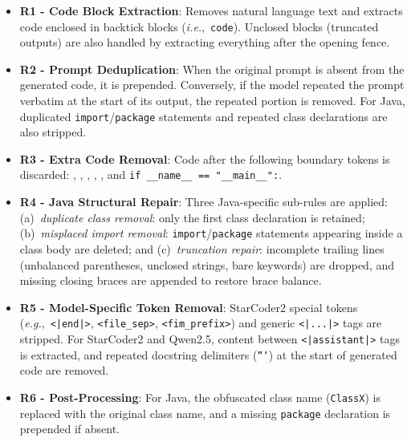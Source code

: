 \documentclass[pdflatex,sn-mathphys-ay]{sn-jnl}
\newcommand{\ie}{\textit{i.e.},\ }
\newcommand{\eg}{\textit{e.g.},\ }
\begin{document}
\begin{itemize}[leftmargin=*, label=-,noitemsep,topsep=0pt]

\item\textbf{R1 - Code Block Extraction}:
Removes natural language text and extracts code enclosed in backtick blocks (\ie \texttt{\small \textasciigrave\textasciigrave\textasciigrave code\textasciigrave\textasciigrave\textasciigrave}). Unclosed blocks (truncated outputs) are also handled by extracting everything after the opening fence.

\item\textbf{R2 - Prompt Deduplication}:
When the original prompt is absent from the generated code, it is prepended. Conversely, if the model repeated the prompt verbatim at the start of its output, the repeated portion is removed. For Java, duplicated \texttt{import}/\texttt{package} statements and repeated class declarations are also stripped.

\item\textbf{R3 - Extra Code Removal}:
Code after the following boundary tokens is discarded: , , , , , and \texttt{if \_\_name\_\_ == "\_\_main\_\_":}.

\item\textbf{R4 - Java Structural Repair}:
Three Java-specific sub-rules are applied: (a)~\textit{duplicate class removal}: only the first class declaration is retained; (b)~\textit{misplaced import removal}: \texttt{import}/\texttt{package} statements appearing inside a class body are deleted; and (c)~\textit{truncation repair}: incomplete trailing lines (unbalanced parentheses, unclosed strings, bare keywords) are dropped, and missing closing braces are appended to restore brace balance.

\item\textbf{R5 - Model-Specific Token Removal}:
StarCoder2 special tokens (\eg \texttt{<|end|>}, \texttt{<file\_sep>}, \texttt{<fim\_prefix>}) and generic \texttt{<|...|>} tags are stripped. For StarCoder2 and Qwen2.5, content between \texttt{<|assistant|>} tags is extracted, and repeated docstring delimiters (\texttt{'''}) at the start of generated code are removed.

\item\textbf{R6 - Post-Processing}:
For Java, the obfuscated class name (\texttt{ClassX}) is replaced with the original class name, and a missing \texttt{package} declaration is prepended if absent.

\end{itemize}
\end{document}
